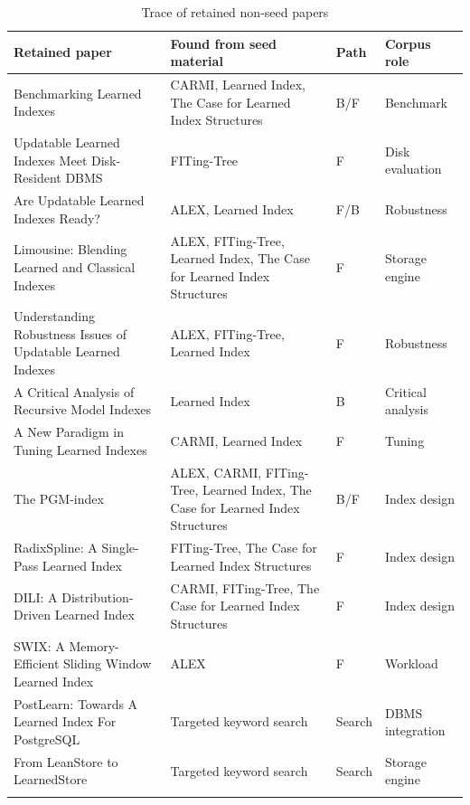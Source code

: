 \documentclass[a4paper, 12pt, twoside]{report}
\begin{document}
\begin{small}
\begin{longtable}{|p{5.1cm}|p{4.4cm}|p{1.2cm}|p{2.1cm}|}
\hline
\textbf{Retained paper} & \textbf{Found from seed material} & \textbf{Path} & \textbf{Corpus role} \\
\hline
Benchmarking Learned Indexes \cite{marcus2020benchmarking} & CARMI, Learned Index, The Case for Learned Index Structures & B/F & Benchmark \\
\hline
Updatable Learned Indexes Meet Disk-Resident DBMS \cite{lan2023disk} & FITing-Tree & F & Disk evaluation \\
\hline
Are Updatable Learned Indexes Ready? \cite{wongkham2022ready} & ALEX, Learned Index & F/B & Robustness \\
\hline
Limousine: Blending Learned and Classical Indexes \cite{chatterjee2024limousine} & ALEX, FITing-Tree, Learned Index, The Case for Learned Index Structures & F & Storage engine \\
\hline
Understanding Robustness Issues of Updatable Learned Indexes \cite{luo2025robustness} & ALEX, FITing-Tree, Learned Index & F & Robustness \\
\hline
A Critical Analysis of Recursive Model Indexes \cite{maltry2022critical} & Learned Index & B & Critical analysis \\
\hline
A New Paradigm in Tuning Learned Indexes \cite{wang2025tuning} & CARMI, Learned Index & F & Tuning \\
\hline
The PGM-index \cite{ferragina2020pgm} & ALEX, CARMI, FITing-Tree, Learned Index, The Case for Learned Index Structures & B/F & Index design \\
\hline
RadixSpline: A Single-Pass Learned Index \cite{kipf2020radixspline} & FITing-Tree, The Case for Learned Index Structures & F & Index design \\
\hline
DILI: A Distribution-Driven Learned Index \cite{li2023dili} & CARMI, FITing-Tree, The Case for Learned Index Structures & F & Index design \\
\hline
SWIX: A Memory-Efficient Sliding Window Learned Index \cite{liang2024swix} & ALEX & F & Workload \\
\hline
PostLearn: Towards A Learned Index For PostgreSQL \cite{fuad2026postlearn} & Targeted keyword search & Search & DBMS integration \\
\hline
From LeanStore to LearnedStore \cite{maharjan2023learnedstore} & Targeted keyword search & Search & Storage engine \\
\hline
\caption{Trace of retained non-seed papers}
\label{tab:appendix-retained-trace}
\end{longtable}
\end{small}
\end{document}
